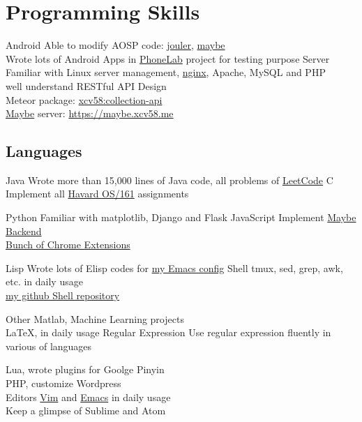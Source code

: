 

\section{Programming Skills}
\cvcomputer
{Android}{
  Able to modify AOSP code:
  \href{http://platform.phone-lab.org:8080/gitweb?p=platform/frameworks/base.git;a=search;h=refs/heads/experiment/1/jouler;s=Yihong+Chen;st=author}{jouler},
  \href{http://platform.phone-lab.org:8080/gitweb?p=platform/frameworks/base.git;a=search;h=refs/heads/experiment/3/maybe;s=Yihong+Chen;st=author}{maybe}
  \\Wrote lots of Android Apps in
  \href{https://phone-lab.org/}{PhoneLab} project for testing purpose
}
{Server}{
  Familiar with Linux server management,
  \href{https://github.com/xcv58/nginx-config}{nginx}, Apache, MySQL and PHP
  \\well understand RESTful API Design
  \\Meteor package:
  \href{https://atmospherejs.com/xcv58/collection-api}{xcv58:collection-api}
  \\\href{http://blue.cse.buffalo.edu/projects/maybe}{Maybe} server: \href{https://maybe.xcv58.me}{https://maybe.xcv58.me}
}

\subsection{Languages}
\cvcomputer
{Java}{
  Wrote more than 15,000 lines of Java code, all problems of
  \href{https://github.com/xcv58/LeetCode}{LeetCode}
}
{C}{
  Implement all \href{http://www.eecs.harvard.edu/~syrah/os161/}{Havard OS/161} assignments
}

\cvcomputer
{Python}{
  Familiar with matplotlib, Django and Flask
}
{JavaScript}{
  Implement \href{https://maybe.xcv58.me}{Maybe Backend}\\
  \href{https://chrome.google.com/webstore/search/xcv58?hl=en}{Bunch of Chrome Extensions}
}

\cvcomputer
{Lisp}{
  Wrote lots of Elisp codes for \href{https://github.com/xcv58/Emacs_config}{my Emacs config}
}
{Shell}{
  tmux, sed, grep, awk, etc. in daily usage\\
  \href{https://github.com/xcv58/Shell_script}{my github Shell repository}
}

\cvcomputer
{Other}{
  Matlab, Machine Learning projects\\
  {\LaTeX}, in daily usage
}
{Regular Expression}{
  Use regular expression fluently in various of languages
}

\cvcomputer
{}{
  Lua, wrote plugins for Goolge Pinyin\\
  PHP, customize Wordpress\\
}
{Editors}{
  \href{https://github.com/xcv58/Vim_config}{Vim} and
  \href{https://github.com/xcv58/Emacs_config}{Emacs} in daily usage\\
  Keep a glimpse of Sublime and Atom
}

